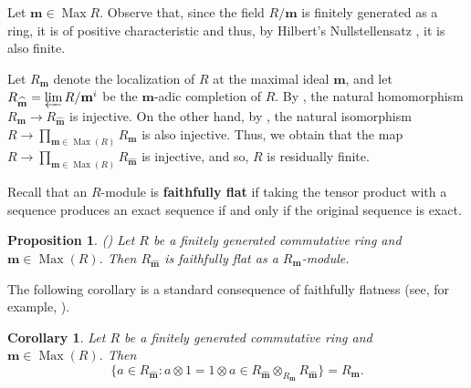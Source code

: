 \documentclass{amsart}
\newtheorem{pro}[lem]{Proposition}
\newtheorem{cor}[lem]{Corollary}
\theoremstyle{definition}
\theoremstyle{remark}
\DeclareMathOperator{\Max}{Max}
\begin{document}
Let  $\mathbf m\in \Max R$.  Observe that, since the field $R/\mathbf m$ is finitely generated as a ring, it is of positive characteristic and thus, by Hilbert's Nullstellensatz \cite[Corollary 5.24]{AMbook}, it is also finite.

 Let $ R_{ {\mathbf m}}$ denote the localization of $R$ at the maximal  ideal $\mathbf m$,  and  let $R_{\widehat{\mathbf m}}=\varprojlim R /\mathbf m^i$ be the $\mathbf m$-adic completion of $R$. By  \cite[Corollary 10.20]{AMbook}, the natural homomorphism $R_ {\mathbf m}\to R_{\widehat{\mathbf m}}$ is injective.  On the other hand, by \cite[Proposition 3.9]{AMbook}, the natural isomorphism $R\to \prod_{\mathbf m\in \Max (R)} R_{ {\mathbf m}}$ is also injective. Thus, we obtain that the map $R\to \prod_{\mathbf m\in \Max (R)} R_{\widehat {\mathbf m}}$ is injective, and so, $R$ is residually finite.
 
 
 
Recall that an $R$-module is {\bf faithfully flat} if taking the tensor product with a sequence produces an exact sequence if and only if the original sequence is exact. 
 \begin{pro}(\cite[Exercise 10.7]{AMbook}) \label{ff}  Let  $R$  be a finitely generated  commutative ring and $\mathbf m\in \Max(R)$.
 Then $R_{\widehat{\mathbf m}}$ is  faithfully flat as a $R_{ {\mathbf m}}$-module.
 \end{pro}
 The following corollary is a standard consequence of faithfully flatness (see, for example, \cite[Theorem III.6.6]{Arnotes}).
 
 \begin{cor}\label{tensor}
  Let  $R$  be a finitely generated  commutative ring and $\mathbf m\in \Max(R)$. Then
  $$\{a\in R_{\widehat{\mathbf m}}\colon a\otimes 1=1\otimes a \in R_{\widehat{\mathbf m}}\otimes_{R_{ {\mathbf m}}}R_{\widehat{\mathbf m}}\}=R_{ {\mathbf m}}.$$
 \end{cor}
\end{document}
